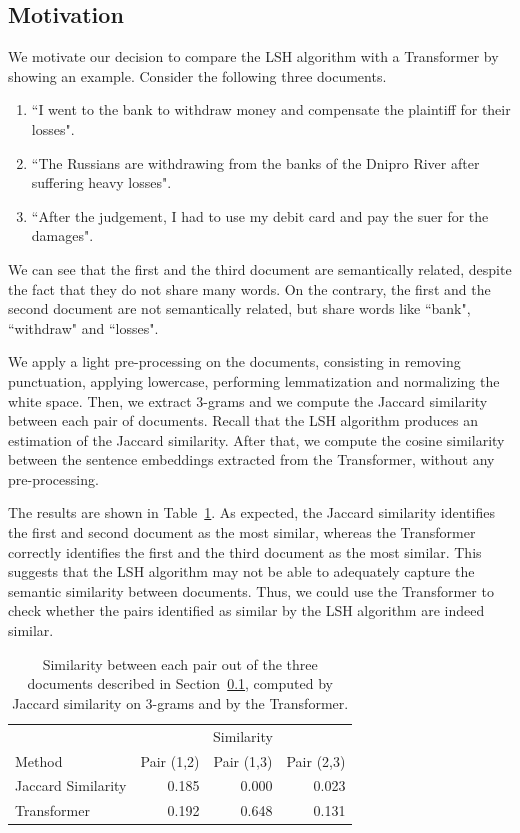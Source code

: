 \documentclass[runningheads]{llncs}
\begin{document}
\subsection{Motivation}
\label{subsec:models:motivation}

We motivate our decision to compare the LSH algorithm with a Transformer by showing an example. Consider the following three documents.
\begin{enumerate}
  \item “I went to the bank to withdraw money and compensate the plaintiff for their losses".
  \item “The Russians are withdrawing from the banks of the Dnipro River after suffering heavy losses".
  \item “After the judgement, I had to use my debit card and pay the suer for the damages".
\end{enumerate}
We can see that the first and the third document are semantically related, despite the fact that they do not share many words. On the contrary, the first and the second document are not semantically related, but share words like “bank", “withdraw" and “losses".

We apply a light pre-processing on the documents, consisting in removing punctuation, applying lowercase, performing lemmatization and normalizing the white space. Then, we extract 3-grams and we compute the Jaccard similarity between each pair of documents. Recall that the LSH algorithm produces an estimation of the Jaccard similarity. After that, we compute the cosine similarity between the sentence embeddings extracted from the Transformer, without any pre-processing.

The results are shown in Table~\ref{tab:models:comparison}. As expected, the Jaccard similarity identifies the first and second document as the most similar, whereas the Transformer correctly identifies the first and the third document as the most similar. This suggests that the LSH algorithm may not be able to adequately capture the semantic similarity between documents. Thus, we could use the Transformer to check whether the pairs identified as similar by the LSH algorithm are indeed similar.

\begin{table}
  \caption{Similarity between each pair out of the three documents described in Section~\ref{subsec:models:motivation}, computed by Jaccard similarity on 3-grams and by the Transformer.}
  \label{tab:models:comparison}
  \centering
  \begin{tabular}{lrrr}
      \toprule
      & \multicolumn{3}{c}{Similarity} \\
      \cmidrule{2-4}
      Method & Pair (1,2) & Pair (1,3) & Pair (2,3) \\
      \midrule
      Jaccard Similarity & 0.185 & 0.000 & 0.023\\
      Transformer & 0.192 & 0.648 & 0.131 \\
      \bottomrule
  \end{tabular}
\end{table}
\end{document}
